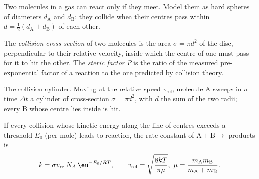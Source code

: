 Two molecules in a gas can react only if they meet. Model them as hard spheres
of diameters $d_{\mathrm A}$ and $d_{\mathrm B}$: they collide when their centres pass within $d =
\frac12(d_{\mathrm A} + d_{\mathrm B})$ of each other.

\begin{definition}\label{def:b3:rate-theories:collision}
The \emph{collision cross-section} of two molecules
is the area $\sigma = \pi d^2$ of the disc, perpendicular to their relative velocity,
inside which the centre of one must pass for it to hit the other. The
\emph{steric factor} $P$ is the ratio of the measured
pre-exponential factor of a reaction to the one predicted by collision theory.
\end{definition}

\begin{omfigure}

{\small The collision cylinder. Moving at the relative speed $v_{\mathrm{rel}}$, molecule A sweeps
in a time $\Delta t$ a cylinder of cross-section $\sigma = \pi d^2$, with $d$ the sum of the two
radii; every B whose centre lies inside is hit.}
\end{omfigure}

\begin{theorem}\label{thm:b3:rate-theories:collision}
If every collision whose kinetic energy along the line of centres exceeds a
threshold $E_0$ (per mole) leads to reaction, the rate constant of $\mathrm{A + B} \to$
products is
\[
  k = \sigma\bar v_{\mathrm{rel}}N_A\,\eu^{-E_0/RT}, \qquad \bar v_{\mathrm{rel}} = \sqrt{\frac{8kT}{\pi\mu}},\
  \mu = \frac{m_{\mathrm A}m_{\mathrm B}}{m_{\mathrm A} + m_{\mathrm B}} .
\]
\end{theorem}

